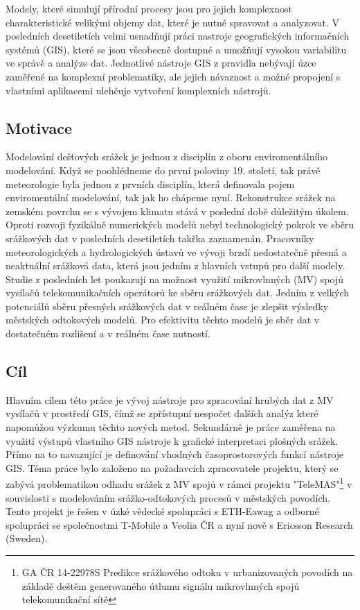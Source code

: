 \documentclass[a4paper,12pt,oneside]{report}
\begin{document}
Modely, které simulují přírodní procesy jsou pro jejich komplexnost charakteristické velikými objemy dat, které je nutné spravovat a analyzovat. V posledních desetiletích velmi usnadňují práci nastroje geografických informačních systémů (GIS), které se jsou všeobecně dostupné a umožňují vysokou variabilitu ve správě a analýze dat. Jednotlivé nástroje GIS z pravidla nebývají úzce zaměřené na komplexní problematiky, ale jejich návaznost a možné propojení s vlastními aplikacemi ulehčuje vytvoření komplexních nástrojů.

\subsection*{Motivace}
Modelování dešťových srážek je jednou z disciplín z oboru enviromentálního modelování. Když se poohlédneme do první poloviny 19. století, tak právě meteorologie byla jednou z prvních disciplín, která definovala pojem enviromentální modelování, tak jak ho chápeme nyní. Rekonstrukce srážek na zemském povrchu se s vývojem klimatu stává v poslední době důležitým úkolem. Oproti rozvoji fyzikálně numerických modelů nebyl technologický pokrok ve sběru srážkových dat v posledních desetiletích takřka zaznamenán. Pracovníky meteorologických a hydrologických ústavů ve vývoji brzdí nedostatečně přesná a neaktuální srážková data, která jsou jedním z hlavních vstupů pro další modely. Studie z posledních let poukazují na možnost využití mikrovlnných (MV) spojů vysílačů telekomunikačních operátorů ke sběru srážkových dat. Jedním z velkých  potenciálů sběru přesných srážkových dat v reálném čase je  zlepšit výsledky  městských odtokových modelů. Pro efektivitu těchto modelů je sběr dat v dostatečném rozlišení a v reálném čase nutností.

\subsection*{Cíl}
Hlavním cílem této práce je vývoj nástroje pro zpracování hrubých dat z MV vysílačů v prostředí GIS, čímž se zpřístupní nespočet dalších analýz které napomůžou výzkumu těchto nových metod. Sekundárně je práce zaměřena na využití výstupů vlastního GIS nástroje k grafické interpretaci plošných srážek. Přímo na to navazující je definování vhodných časoprostorových funkcí nástroje GIS. Téma práce bylo založeno na požadavcích zpracovatele projektu, který se zabývá problematikou odhadu srážek z MV spojů v rámci projektu "TeleMAS"\footnote{GA ČR 14-22978S Predikce srážkového odtoku v urbanizovaných povodích na základě deštěm generovaného útlumu signálu mikrovlnných spojů telekomunikační sítě} v souvislosti s modelováním srážko-odtokových procesů v městských povodích. Tento projekt je řešen v úzké vědecké spolupráci s ETH-Eawag a odborné spolupráci se společnostmi T-Mobile a Veolia ČR a nyní nově s Ericsson Research (Sweden).
\end{document}
